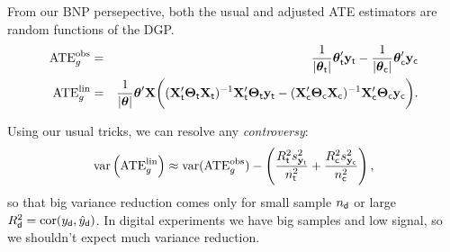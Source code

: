 \documentclass[11pt,xcolor=svgnames]{beamer}
\newcommand{\theme}{\color{Maroon}}
\newcommand{\gr}{\color{black!50}}
\newcommand{\bs}[1]{\boldsymbol{#1}}
\newcommand{\mr}[1]{\mathrm{#1}}
\newcommand{\bm}[1]{\mathbf{#1}}
\newcommand{\ds}[1]{\mathds{#1}}
\begin{document}

\begin{frame}

From our BNP persepective, both the usual and adjusted ATE estimators are random functions of the DGP.
\begin{eqnarray*}
\text{ATE}^\text{obs}_g &=& 
\frac{1}{|\bs{\theta}_{\sf t}|}\bs{\theta}_{\sf t}'\bm{y}_{\sf t} - \frac{1}{|\bs{\theta}_{\sf c}|}\bs{\theta}_{\sf c}'\bm{y}_{\sf c}
\\
\text{ATE}^\text{lin}_g &=& \frac{1}{|\bs{\theta}|}\bs{\theta}'\bm{X}\bigg( (\bm{X}_{\sf t}'\bs{\Theta}_{\sf t}\bm{X}_{\sf t})^{-1}  \bm{X}_{\sf t}'\bs{\Theta}_{\sf t}\bm{y}_{\sf t} - (\bm{X}_{\sf c}'\bs{\Theta}_{\sf c}\bm{X}_{\sf c})^{-1}  \bm{X}_{\sf c}'\bs{\Theta}_{\sf c}\bm{y}_{\sf c}\bigg).
\end{eqnarray*}

Using our usual tricks, we can resolve any \textit{controversy}:
\[
\mr{var}\left(\text{ATE}^\text{lin}_g\right) \approx \mr{var}(\text{ATE}^\text{obs}_g) - \left( \frac{R^2_{\sf t}s^2_{\bm{y}_{\sf t}}}{n^2_{\sf t}} +  
\frac{R^2_{\sf c}s^2_{\bm{y}_{\sf c}}}{n^2_{\sf c}} \right),
\]
so that big variance reduction comes only for small sample $n_{\sf d}$ or large $R_{\sf d}^2 = \mr{cor}(y_{\sf d},\hat y_{\sf d})$.  {\theme In digital experiments we have big samples and low signal, so we shouldn't expect much variance reduction.}

\end{frame}
\end{document}
